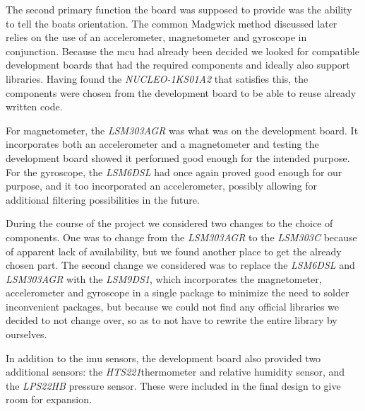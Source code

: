 The second primary function the board was supposed to provide was the ability to tell the boats orientation. The common Madgwick method discussed later relies on the use of an accelerometer, magnetometer and gyroscope in conjunction. Because the \gls{mcu} had already been decided we looked for compatible development boards that had the required components and ideally also support libraries. Having found the \emph{NUCLEO-1KS01A2} that satisfies this, the components were chosen from the development board to be able to reuse already written code. 

For magnetometer, the \emph{LSM303AGR} was what was on the development board. It incorporates both an accelerometer and a magnetometer and testing the development board showed it performed good enough for the intended purpose. For the gyroscope, the \emph{LSM6DSL} had once again proved good enough for our purpose, and it too incorporated an accelerometer, possibly allowing for additional filtering possibilities in the future. 

During the course of the project we considered two changes to the choice of components. One was to change from the \emph{LSM303AGR} to the \emph{LSM303C} because of apparent lack of availability, but we found another place to get the already chosen part. The second change we considered was to replace the \emph{LSM6DSL} and \emph{LSM303AGR} with the \emph{LSM9DS1}, which incorporates the magnetometer, accelerometer and gyroscope in a single package to minimize the need to solder inconvenient packages, but because we could not find any official libraries we decided to not change over, so as to not have to rewrite the entire library by ourselves. 

In addition to the \gls{imu} sensors, the development board also provided two additional sensors: the \emph{HTS221}thermometer and relative humidity sensor, and the \emph{LPS22HB} pressure sensor. These were included in the final design to give room for expansion. 

